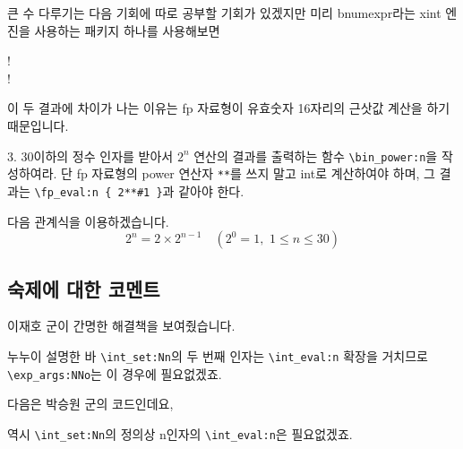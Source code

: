 \documentclass[a4paper,amsmath]{oblivoir}
\newcounter{sub}
\begin{document}
큰 수 다루기는 다음 기회에 따로 공부할 기회가 있겠지만 미리 \textsf{bnumexpr}라는 \textsf{xint} 엔진을 사용하는 패키지 하나를 사용해보면 

\begin{exampleside}
!\relax \\
!\relax
\end{exampleside}

이 두 결과에 차이가 나는 이유는 fp 자료형이 유효숫자 16자리의 근삿값 계산을 하기 때문입니다.

\newpage

\begin{questionp}
 3. 30이하의 정수 인자를 받아서 $2^n$ 연산의 결과를 출력하는 함수 \verb|\bin_power:n|을 작성하여라. 단 \textsf{fp} 자료형의 power 연산자 \verb|**|를 쓰지 말고 \textsf{int}로 계산하여야 하며, 그 결과는 \verb|\fp_eval:n { 2**#1 }|과 같아야 한다.
\end{questionp}

다음 관계식을 이용하겠습니다.
\[
    2^n = 2 \times 2^{n-1} \quad (2^0 = 1, \,\, 1 \le n \le 30 )
\]


\subsection*{숙제에 대한 코멘트}

이재호 군이 간명한 해결책을 보여줬습니다.
누누이 설명한 바 \verb|\int_set:Nn|의 두 번째 인자는 \verb|\int_eval:n| 확장을 거치므로 \verb|\exp_args:NNo|는 이 경우에 필요없겠죠.

다음은 박승원 군의 코드인데요,
역시 \verb|\int_set:Nn|의 정의상 n인자의 \verb|\int_eval:n|은 필요없겠죠.
\end{document}
